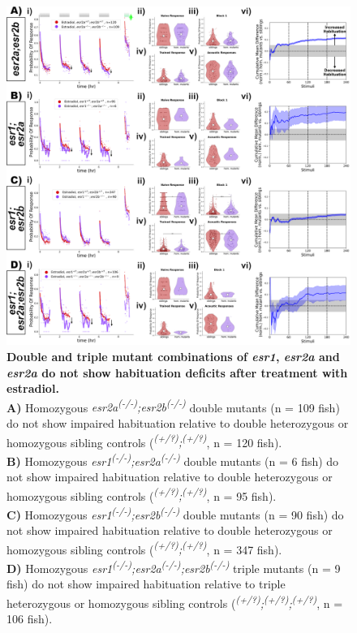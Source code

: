 \documentclass[10pt,lineno]{RandlettLab_elife}
\begin{document}
{\begin{figure}
\begin{fullwidth}
\begin{center}
\includegraphics[width=0.75\linewidth]{figures/NuclearDoubleAndTripleMutants.png}
\caption{ \textbf{Double and triple mutant combinations of \emph{esr1}, \emph{esr2a} and \emph{esr2a} do not show habituation deficits after treatment with estradiol.} \scriptsize
\\ \textbf{A)} Homozygous \emph{esr2a\textsuperscript{(-/-)};esr2b\textsuperscript{(-/-)}} double mutants (n = 109 fish) do not show impaired habituation relative to double heterozygous or homozygous sibling controls (\emph{\textsuperscript{(+/?)};\textsuperscript{(+/?)}}, n = 120 fish). 
\\ \textbf{B)} Homozygous \emph{esr1\textsuperscript{(-/-)};esr2a\textsuperscript{(-/-)}} double mutants (n = 6 fish) do not show impaired habituation relative to double heterozygous or homozygous sibling controls (\emph{\textsuperscript{(+/?)};\textsuperscript{(+/?)}}, n = 95 fish). 
\\ \textbf{C)} Homozygous \emph{esr1\textsuperscript{(-/-)};esr2b\textsuperscript{(-/-)}} double mutants (n = 90 fish) do not show impaired habituation relative to double heterozygous or homozygous sibling controls (\emph{\textsuperscript{(+/?)};\textsuperscript{(+/?)}}, n = 347 fish). 
\\ \textbf{D)} Homozygous \emph{esr1\textsuperscript{(-/-)};esr2a\textsuperscript{(-/-)};esr2b\textsuperscript{(-/-)}} triple mutants (n = 9 fish) do not show impaired habituation relative to triple heterozygous or homozygous sibling controls (\emph{\textsuperscript{(+/?)};\textsuperscript{(+/?)};\textsuperscript{(+/?)}}, n = 106 fish). 
}
\end{center}
\end{fullwidth}
\end{figure}}
\end{document}
